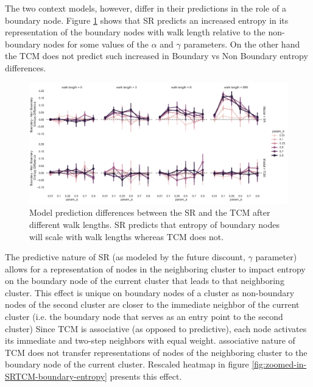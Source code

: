 The two context models, however, differ in their predictions in the role of a boundary node. Figure \ref{fig:SR-TCM-walklength-boundary-nonboundary-entropydiff} shows that SR predicts an increased entropy in its representation of the boundary nodes with walk length relative to the non-boundary nodes for some values of the $\alpha$ and $\gamma$ parameters. On the other hand the TCM does not predict such increased in Boundary vs Non Boundary entropy differences. 
\begin{figure}[ht]
	\centering
	\label{fig:SR-TCM-walklength-boundary-nonboundary-entropydiff}
	\includegraphics[width = \textwidth]{chapter_notebooks/chapter_2/figures/SR_TCM_walklength_boundary_nonboundary_entropydiff.png}
	\caption{Model prediction differences between the SR and the TCM after different walk lengths. SR predicts that entropy of boundary nodes will scale with walk lengths whereas TCM does not.}
\end{figure}


The predictive nature of SR (as modeled by the future discount, $\gamma$ parameter) allows for a representation of nodes in the neighboring cluster to impact entropy on the boundary node of the current cluster that leads to that neighboring cluster. This effect is unique on boundary nodes of a cluster as non-boundary nodes of the second cluster are closer to the immediate neighbor of the current cluster (i.e. the boundary node that serves as an entry point to the second cluster) Since TCM is associative (as opposed to predictive), each node activates its immediate and two-step neighbors with equal weight. associative nature of TCM does not transfer representations of nodes of the neighboring cluster to the boundary node of the current cluster. Rescaled heatmap in figure \ref{fig:zoomed-in-SRTCM-boundary-entropy} presents this effect.

